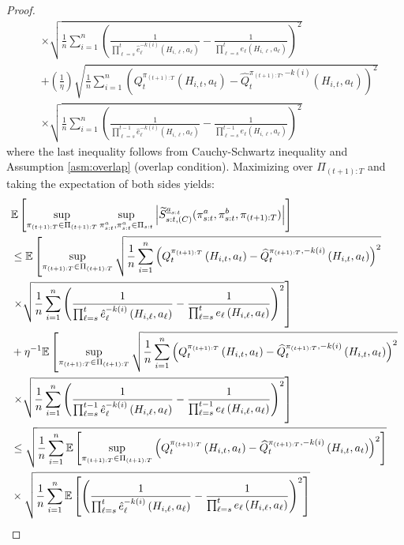 \begin{proof}
\begin{align*}
 &\times \sqrt{\frac{1}{n}\sum_{i=1}^{n}\left(\frac{1}{\prod_{\ell=s}^{t}\hat{e}_{\ell}^{-k(i)}(H_{i,\ell},a_{\ell})}-\frac{1}{\prod_{\ell=s}^{t}e_{\ell}(H_{i,\ell},a_{\ell})}\right)^{2}}\\
	&+\left(\frac{1}{\eta}\right)\sqrt{\frac{1}{n}\sum_{i=1}^{n}\left(Q_{t}^{\pi_{(t+1):T}}\left(H_{i,t},a_{t}\right)-\widehat{Q}_{t}^{\pi_{(t+1):T},-k(i)}\left(H_{i,t},a_{t}\right)\right)^{2}}\\ &\times \sqrt{\frac{1}{n}\sum_{i=1}^{n}\left(\frac{1}{\prod_{\ell=s}^{t-1}\hat{e}_{\ell}^{-k(i)}(H_{i,\ell},a_{\ell})}-\frac{1}{\prod_{\ell=s}^{t-1}e_{\ell}(H_{i,\ell},a_{\ell})}\right)^{2}}
\end{align*}
where the last inequality follows from Cauchy-Schwartz inequality and Assumption \ref{asm:overlap} (overlap condition). Maximizing over $\Pi_{(t+1):T}$ and taking the expectation of both sides yields:
\begin{align*}
 & \E\left[\sup_{\pi_{(t+1):T}\in \Pi_{(t+1):T}}\sup_{\pi_{s:t}^{a},\pi_{s:t}^{a}\in \Pi_{s:t}} \left| \widetilde{S}_{s:t,(C)}^{\underline{a}_{s:t}}(\pi_{s:t}^{a},\pi_{s:t}^{b},\pi_{(t+1):T})\right|\right] \\
 &\leq	\E\left[\sup_{\pi_{(t+1):T}\in \Pi_{(t+1):T}}\sqrt{\frac{1}{n}\sum_{i=1}^{n}\left(Q_{t}^{\pi_{(t+1):T}}\left(H_{i,t},a_{t}\right)-\widehat{Q}_{t}^{\pi_{(t+1):T},-k(i)}\left(H_{i,t},a_{t}\right)\right)^{2}}\right. \\
&	\left.\times\sqrt{\frac{1}{n}\sum_{i=1}^{n}\left(\frac{1}{\prod_{\ell=s}^{t}\hat{e}_{\ell}^{-k(i)}\left(H_{i,\ell},a_{\ell}\right)}-\frac{1}{\prod_{\ell=s}^{t}e_{\ell}\left(H_{i,\ell},a_{\ell}\right)}\right)^{2}}\right] \\
& + \eta^{-1}\E\left[\sup_{\pi_{(t+1):T}\in \Pi_{(t+1):T}}\sqrt{\frac{1}{n}\sum_{i=1}^{n}\left(Q_{t}^{\pi_{(t+1):T}}\left(H_{i,t},a_{t}\right)-\widehat{Q}_{t}^{\pi_{(t+1):T},-k(i)}\left(H_{i,t},a_{t}\right)\right)^{2}}\right. \\
&	\left.\times\sqrt{\frac{1}{n}\sum_{i=1}^{n}\left(\frac{1}{\prod_{\ell=s}^{t-1}\hat{e}_{\ell}^{-k(i)}\left(H_{i,\ell},a_{\ell}\right)}-\frac{1}{\prod_{\ell=s}^{t-1}e_{\ell}\left(H_{i,\ell},a_{\ell}\right)}\right)^{2}}\right] \\
 &\leq	\sqrt{\frac{1}{n}\sum_{i=1}^{n}\E\left[\sup_{\pi_{(t+1):T}\in \Pi_{(t+1):T}}\left(Q_{t}^{\pi_{(t+1):T}}\left(H_{i,t},a_{t}\right)-\widehat{Q}_{t}^{\pi_{(t+1):T},-k(i)}\left(H_{i,t},a_{t}\right)\right)^{2}\right]} \\
&	\times\sqrt{\frac{1}{n}\sum_{i=1}^{n}\E\left[\left(\frac{1}{\prod_{\ell=s}^{t}\hat{e}_{\ell}^{-k(i)}\left(H_{i,\ell},a_{\ell}\right)}-\frac{1}{\prod_{\ell=s}^{t}e_{\ell}\left(H_{i,\ell},a_{\ell}\right)}\right)^{2}\right]} \\

\end{align*}
\end{proof}
